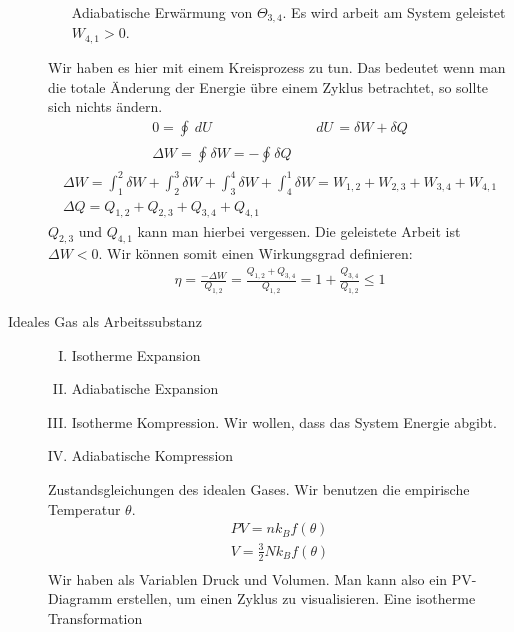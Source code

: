 \documentclass[11pt]{article}
\theoremstyle{plain}
\theoremstyle{mytheoremstyle}
\renewcommand{\d}[1]{\,d#1\,}
\begin{document}
\begin{description}
\begin{enumerate}[I)]
        Adiabatische Erw\"armung von $\Theta_{3,4}$. Es wird arbeit
        am System geleistet $W_{4,1} > 0$.
    \end{enumerate}
    Wir haben es hier mit einem Kreisprozess zu tun. Das bedeutet wenn man die totale
    \"Anderung der Energie \"ubre einem Zyklus betrachtet, so sollte sich nichts
    \"andern.
    \begin{align*}
      0 = \oint_{}^{} \d{U}  && \d{U} = \delta W + \delta Q \\
      \Delta W = \oint_{}^{} \delta W = - \oint_{}^{} \delta Q
    \end{align*}
    \begin{align*}
      \Delta W = \int_{1}^{2} \delta W + \int_{2}^{3} \delta W + 
      \int_{3}^{4} \delta W + \int_{4}^{1} \delta W = W_{1,2} +W_{2,3} +W_{3,4} +W_{4,1}  \\
      \Delta Q = Q_{1,2} + Q_{2,3} + Q_{3,4} + Q_{4,1}
    \end{align*}
    $Q_{2,3}$ und $Q_{4,1}$ kann man hierbei vergessen. Die geleistete Arbeit
    ist  $\Delta W < 0$. Wir k\"onnen somit einen Wirkungsgrad definieren:
    \begin{align*}
      \eta = \frac{-\Delta W}{Q_{1,2}} = \frac{Q_{1,2} + Q_{3,4}}{Q_{1,2}}
      = 1 + \frac{Q_{3,4}}{Q_{1,2}} \le 1
    \end{align*}
  \item[Ideales Gas als Arbeitssubstanz]
    \begin{enumerate}[I)]
      \item Isotherme Expansion
      \item Adiabatische Expansion
      \item Isotherme Kompression. Wir wollen, dass das System Energie abgibt.
      \item Adiabatische Kompression
    \end{enumerate} 
    Zustandsgleichungen des idealen Gases. Wir benutzen die empirische Temperatur $\theta$.
    \begin{align*}
      P V = n k_B f(\theta) \\
      V = \frac{3}{2} N k_B f(\theta) \\
    \end{align*}
    Wir haben als Variablen Druck und Volumen. Man kann also ein PV-Diagramm
    erstellen, um einen Zyklus zu visualisieren. Eine isotherme Transformation

\end{description}
\end{document}
